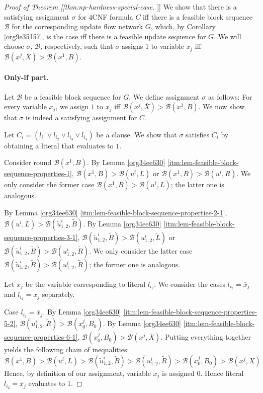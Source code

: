 \documentclass[fontsize=11pt,paper=a4]{book}
\begin{document}
\begin{proof}[Proof of Theorem [[thm:np-hardness-special-case]]]
We show that there is a satisfying assignment \(\sigma\) for 4CNF formula \(C\) iff there is a feasible block sequence \(\mathcal{B}\) for the corresponding update flow network \(G\), which, by Corollary \ref{org9e35157}, is the case iff there is a feasible update sequence for \(G\).
We will choose \(\sigma\), \(\mathcal{B}\), respectively, such that \(\sigma\) assigns \(1\) to variable \(x_j\) iff \(\mathcal{B}(x^j,\bar{X})>\mathcal{B}(x^1,B)\).

\paragraph{Only-if part.}
Let \(\mathcal{B}\) be a feasible block sequence for \(G\).
We define assignment \(\sigma\) as follows:
For every variable \(x_j\), we assign \(1\) to \(x_j\) iff \(\mathcal{B}(x^j,\bar{X})>\mathcal{B}(x^1,B)\).
We now show that \(\sigma\) is indeed a satisfying assignment for \(C\).

Let \(C_i=(l_{i_1}\vee l_{i_2}\vee l_{i_3}\vee l_{i_4})\) be a clause.
We show that \(\sigma\) satisfies \(C_i\) by obtaining a literal that evaluates to \(1\).

Consider round \(\mathcal{B}(x^1,B)\).
By Lemma \ref{org34ee630} \ref{itm:lem-feasible-block-sequence-properties-1}, \(\mathcal{B}(x^1,B)>\mathcal{B}(u^i,L)\) or \(\mathcal{B}(x^1,B)>\mathcal{B}(u^i,R)\).
We only consider the former case \(\mathcal{B}(x^1,B)>\mathcal{B}(u^i,L)\); the latter one is analogous.

By Lemma \ref{org34ee630} \ref{itm:lem-feasible-block-sequence-properties-2-1}, \(\mathcal{B}(u^i,L)>\mathcal{B}(\tilde{u}_{1,2}^i,\tilde{B})\).
By Lemma \ref{org34ee630} \ref{itm:lem-feasible-block-sequence-properties-3-1}, \(\mathcal{B}(\tilde{u}_{1,2}^i,\tilde{B})>\mathcal{B}(u_{1,2}^i,\tilde{L})\) or \(\mathcal{B}(\tilde{u}_{1,2}^i,\tilde{B})>\mathcal{B}(u_{1,2}^i,\tilde{R})\).
We only consider the latter case \(\mathcal{B}(\tilde{u}_{1,2}^i,\tilde{B})>\mathcal{B}(u_{1,2}^i,\tilde{R})\); the former one is analogous.

Let \(x_j\) be the variable corresponding to literal \(l_{i_2}\).
We consider the cases \(l_{i_2}=\bar{x}_j\) and \(l_{i_2}=x_j\) separately.

Case \(l_{i_2}=\bar{x}_j\).
By Lemma \ref{org34ee630} \ref{itm:lem-feasible-block-sequence-properties-5-2}, \(\mathcal{B}(u_{1,2}^i,\tilde{R})>\mathcal{B}(x_0^j,B_0)\).
By Lemma \ref{org34ee630} \ref{itm:lem-feasible-block-sequence-properties-6-1}, \(\mathcal{B}(x_0^j,B_0)>\mathcal{B}(x^j,\bar{X})\).
Putting everything together yields the following chain of inequalities:
\[
\mathcal{B}(x^1,B)>
\mathcal{B}(u^i,L)>
\mathcal{B}(\tilde{u}_{1,2}^i,\tilde{B})>
\mathcal{B}(u_{1,2}^i,\tilde{R})>
\mathcal{B}(x_0^j,B_0)>
\mathcal{B}(x^j,\bar{X})
\]
Hence, by definition of our assignment, variable \(x_j\) is assigned \(0\).
Hence literal \(l_{i_2}=\bar{x}_j\) evaluates to \(1\).


\end{proof}
\end{document}
